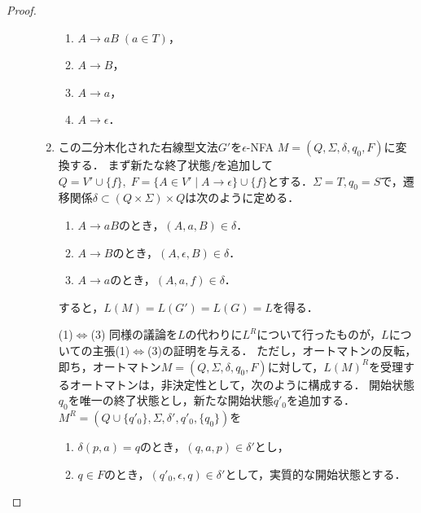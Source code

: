 \documentclass[uplatex, dvipdfmx]{jsreport}
\begin{document}
\begin{proof}
\begin{description}
\begin{enumerate}
            \begin{enumerate}
                \item $A\to aB\;(a\in T)$，
                \item $A\to B$，
                \item $A\to a$，
                \item $A\to\epsilon$．
            \end{enumerate}
            \item この二分木化された右線型文法$G'$を$\epsilon$-NFA $M=(Q,\Sigma,\delta,q_0,F)$に変換する．
            まず新たな終了状態$f$を追加して$Q=V'\cup\{f\},\;F=\{A\in V'\mid A\to\epsilon\}\cup\{f\}$とする．$\Sigma=T,q_0=S$で，遷移関係$\delta\subset (Q\times\Sigma)\times Q$は次のように定める．
            \begin{enumerate}
                \item $A\to aB$のとき，$(A,a,B)\in\delta$．
                \item $A\to B$のとき，$(A,\epsilon,B)\in\delta$．
                \item $A\to a$のとき，$(A,a,f)\in\delta$．
            \end{enumerate}
            すると，$L(M)=L(G')=L(G)=L$を得る．
            \item[(1)$\Leftrightarrow$(3)]
            同様の議論を$L$の代わりに$L^R$について行ったものが，$L$についての主張(1)$\Leftrightarrow$(3)の証明を与える．
            ただし，オートマトンの反転，即ち，オートマトン$M=(Q,\Sigma,\delta,q_0,F)$に対して，$L(M)^R$を受理するオートマトンは，非決定性として，次のように構成する．
            開始状態$q_0$を唯一の終了状態とし，新たな開始状態$q'_0$を追加する．
            $M^R=(Q\cup\{q'_0\},\Sigma,\delta',q'_0,\{q_0\})$を
            \begin{enumerate}
                \item $\delta(p,a)=q$のとき，$(q,a,p)\in\delta'$とし，
                \item $q\in F$のとき，$(q'_0,\epsilon,q)\in\delta'$として，実質的な開始状態とする．
            \end{enumerate}
        \end{enumerate}
    \end{description}
\end{proof}
\end{document}
